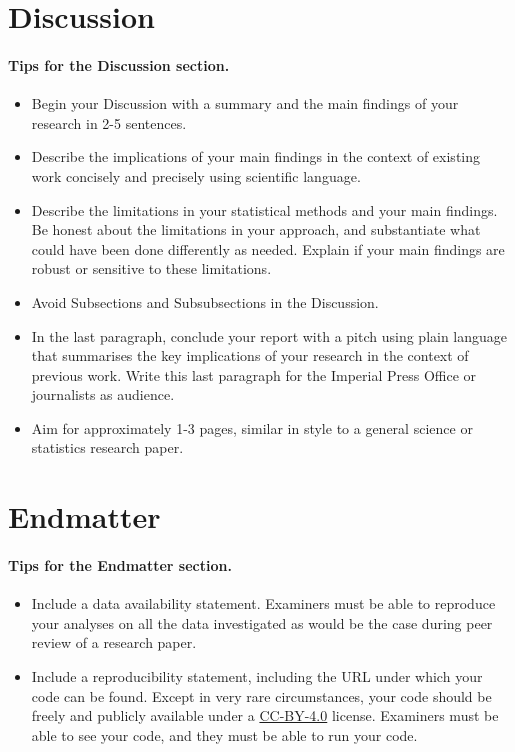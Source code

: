 \documentclass{statsmsc}
\begin{document}
\section{Discussion}

\paragraph{Tips for the Discussion section.} 

\begin{itemize}
    \item Begin your Discussion with a summary and the main findings of your research in 2-5 sentences.
    \item Describe the implications of your main findings in the context of existing work concisely and precisely using scientific language. 
    \item Describe the limitations in your statistical methods and your main findings. Be honest about the limitations in your approach, and substantiate what could have been done differently as needed. Explain if your main findings are robust or sensitive to these limitations.
    \item Avoid Subsections and Subsubsections in the Discussion.
    \item In the last paragraph, conclude your report with a pitch using plain language that summarises the key implications of your research in the context of previous work. Write this last paragraph for the Imperial Press Office or journalists as audience.
    \item Aim for approximately 1-3 pages, similar in style to a general science or statistics research paper.
\end{itemize}

\section{Endmatter} \label{sec:endmatter}

\paragraph{Tips for the Endmatter section.} 

\begin{itemize}
    \item Include a data availability statement. Examiners must be able to reproduce your analyses on all the data investigated as would be the case during peer review of a research paper.
    \item Include a reproducibility statement, including the URL under which your code can be found. Except in very rare circumstances, your code should be freely and publicly available under a \href{https://creativecommons.org/licenses/by/4.0/deed.en}{CC-BY-4.0} license. Examiners must be able to see your code, and they must be able to run your code.
\end{itemize}
\end{document}
